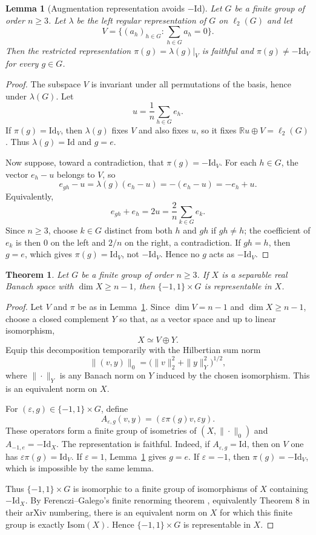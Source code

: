 \documentclass[11pt]{article}
\newtheorem{theorem}{Theorem}
\newtheorem{lemma}{Lemma}
\newcommand{\R}{\mathbb{R}}
\newcommand{\Id}{\mathrm{Id}}
\newcommand{\Isom}{\mathrm{Isom}}
\begin{document}
\begin{lemma}[Augmentation representation avoids $-\Id$]
\label{lem:augmentation}
Let $G$ be a finite group of order $n\geq 3$.  Let $\lambda$ be the left
regular representation of $G$ on $\ell_2(G)$ and let
\[
  V=\Big\{(a_h)_{h\in G}: \sum_{h\in G} a_h=0\Big\}.
\]
Then the restricted representation $\pi(g)=\lambda(g)|_V$ is faithful and
$\pi(g)\neq -\Id_V$ for every $g\in G$.
\end{lemma}

\begin{proof}
The subspace $V$ is invariant under all permutations of the basis, hence under
$\lambda(G)$.  Let
\[
  u=\frac{1}{n}\sum_{h\in G} e_h.
\]
If $\pi(g)=\Id_V$, then $\lambda(g)$ fixes $V$ and also fixes $u$, so it fixes
$\R u\oplus V=\ell_2(G)$.  Thus $\lambda(g)=\Id$ and $g=e$.

Now suppose, toward a contradiction, that $\pi(g)=-\Id_V$.  For each $h\in G$,
the vector $e_h-u$ belongs to $V$, so
\[
  e_{gh}-u=\lambda(g)(e_h-u)=-(e_h-u)=-e_h+u.
\]
Equivalently,
\[
  e_{gh}+e_h = 2u=\frac{2}{n}\sum_{k\in G}e_k.
\]
Since $n\geq 3$, choose $k\in G$ distinct from both $h$ and $gh$ if
$gh\neq h$; the coefficient of $e_k$ is then $0$ on the left and $2/n$ on the
right, a contradiction.  If $gh=h$, then $g=e$, which gives
$\pi(g)=\Id_V$, not $-\Id_V$.  Hence no $g$ acts as $-\Id_V$.
\end{proof}

\begin{theorem}
\label{thm:nminusone}
Let $G$ be a finite group of order $n\geq 3$.  If $X$ is a separable real
Banach space with $\dim X\geq n-1$, then $\{-1,1\}\times G$ is representable
in $X$.
\end{theorem}

\begin{proof}
Let $V$ and $\pi$ be as in Lemma~\ref{lem:augmentation}.  Since
$\dim V=n-1$ and $\dim X\geq n-1$, choose a closed complement $Y$ so that, as
a vector space and up to linear isomorphism,
\[
  X\simeq V\oplus Y.
\]
Equip this decomposition temporarily with the Hilbertian sum norm
\[
  \|(v,y)\|_0=\big(\|v\|_2^2+\|y\|_Y^2\big)^{1/2},
\]
where $\|\cdot\|_Y$ is any Banach norm on $Y$ induced by the chosen
isomorphism.  This is an equivalent norm on $X$.

For $(\varepsilon,g)\in \{-1,1\}\times G$, define
\[
  A_{\varepsilon,g}(v,y)=(\varepsilon \pi(g)v,\varepsilon y).
\]
These operators form a finite group of isometries of $(X,\|\cdot\|_0)$ and
$A_{-1,e}=-\Id_X$.  The representation is faithful.  Indeed, if
$A_{\varepsilon,g}=\Id$, then on $V$ one has $\varepsilon\pi(g)=\Id_V$.  If
$\varepsilon=1$, Lemma~\ref{lem:augmentation} gives $g=e$.  If
$\varepsilon=-1$, then $\pi(g)=-\Id_V$, which is impossible by the same lemma.

Thus $\{-1,1\}\times G$ is isomorphic to a finite group of isomorphisms of
$X$ containing $-\Id_X$.  By Ferenczi--Galego's finite renorming theorem
\cite[Theorem 8]{FG}, equivalently Theorem 8 in their arXiv numbering, there
is an equivalent norm on $X$ for which this finite group is exactly
$\Isom(X)$.  Hence $\{-1,1\}\times G$ is representable in $X$.
\end{proof}
\end{document}
